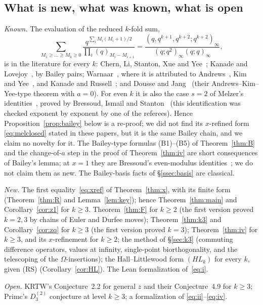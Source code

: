 \documentclass[11pt]{amsart}
\theoremstyle{definition}
\numberwithin{equation}{section}
\begin{document}
\subsection{What is new, what was known, what is open}\label{ssec:novelty}
\emph{Known.} The evaluation of the reduced $k$-fold sum,
\[
\sum_{M_1\ge\dots\ge M_k\ge0}\frac{q^{\sum_iM_i(M_i+1)/2}}{\prod_i(q)_{M_i-M_{i+1}}}
=\frac{(q,q^{k+1},q^{k+2};q^{k+2})_\infty}{(q;q^2)_\infty(q;q)_\infty},
\]
is in the literature for every $k$: Chern, Li, Stanton, Xue and Yee~\cite[Theorem~3.5]{CLSXY};
Kanade and Lovejoy~\cite[Theorem~1.1 with $a=0$]{KL}, by Bailey pairs; Warnaar~\cite[display after
Corollary~5, case $i=0$]{Warnaar2026}, where it is attributed to Andrews~\cite[Theorem~3]{Andrews2010},
Kim and Yee~\cite[Theorem~1.4]{KimYee}, \cite{CLSXY} and Kanade and Russell~\cite[Theorem~13]{KR};
and Dousse and Jang~\cite{DJ} (their Andrews--Kim--Yee-type theorem with $a=0$). For even $k$ it is
also the case $s=2$ of Melzer's identities~\cite[(2.6)]{Melzer}, proved by Bressoud, Ismail and
Stanton~\cite[Theorem~5.2]{BIS} (this identification was checked exponent by exponent by one of the
referees). Hence
Proposition~\ref{prop:bailey} below is a re-proof; we did not find its $x$-refined form
\eqref{eq:melclosed} stated in these papers, but it is the same Bailey chain, and we claim no novelty
for it. The Bailey-type formulas (B1)--(B5) of Theorem~\ref{thm:B} and the change-of-$a$ step in the proof of
Theorem~\ref{thm:iv} are short consequences of Bailey's lemma; at $x=1$ they are Bressoud's even-modulus
identities~\cite{Bressoud79,Bressoud80}; we do not claim them as new. The Bailey-basis facts of §\ref{ssec:basis}
are classical.

\emph{New.} The first equality~\eqref{eq:xref} of Theorem~\ref{thm:x}, with its finite form
(Theorem~\ref{thm:R} and Lemma~\ref{lem:key}); hence Theorem~\ref{thm:main} and Corollary~\ref{cor:z1} for $k\ge3$.
Theorem~\ref{thm:F} for $k\ge2$ (the first version proved $k=2,3$ by chains of Euler and Durfee moves);
Theorem~\ref{thm:k3} and Corollary~\ref{cor:zq} for $k\ge3$ (the first version proved $k=3$);
Theorem~\ref{thm:iv} for $k\ge3$, and its $x$-refinement for $k\ge2$; the method of §\ref{sec:k3} (commuting
difference operators, values at infinity, single-point biorthogonality, and the telescoping of the
$\Omega$-insertions); the Hall--Littlewood form $(HL_k)$ for every $k$, given (RS) (Corollary~\ref{cor:HL}). The Lean
formalization of~\eqref{eq:i}.

\emph{Open.} KRTW's Conjecture~2.2 for general $z$ and their Conjecture~4.9 for $k\ge3$; Primc's $D_3^{(2)}$
conjecture at level $k\ge3$; a formalization of \eqref{eq:ii}--\eqref{eq:iv}.
\end{document}
